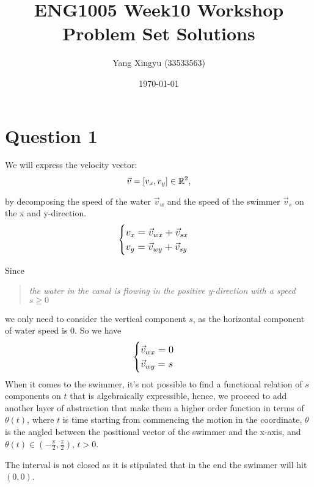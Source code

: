 \documentclass[12pt,a4paper]{article}
\begin{document}
\newcommand{\df}[2]{
    \frac{d#1}{d#2}
}

\title{ENG1005 Week10 Workshop Problem Set Solutions}
\author{Yang Xingyu (33533563)}
\date{\today}
\maketitle

\section*{Question 1}
\begin{solution}
We will express the velocity vector:
\begin{equation}\label{10:1}
    \Vec{v}=[{v}_x,{v}_y]\in \mathbb{R}^2,
\end{equation}

by decomposing the speed of the water $\Vec{v}_w$ and the speed of the swimmer $\Vec{v}_s$ on the x and y-direction.
\begin{equation}\label{10:2}
    \large
    \begin{cases}
        {v_x} = \Vec{v}_{wx} + \Vec{v}_{sx}\\
        {v_y} = \Vec{v}_{wy} + \Vec{v}_{sy}
    \end{cases}
\end{equation}

Since
\begin{quote}
    \textit{the water in the canal is flowing in the positive y-direction with a speed $s \geq 0$}
\end{quote}
we only need to consider the vertical component $s$, as the horizontal component of water speed is 0. So we have
\begin{equation}\label{10:3}
    \large
    \begin{cases}
        \Vec{v}_{wx} = 0\\
        \Vec{v}_{wy} = s
    \end{cases}
\end{equation}
When it comes to the swimmer, it's not possible to find a functional relation of $s$ components on $t$ that is algebraically expressible, hence, we proceed to add another layer of abstraction that make them a higher order function in terms of $\theta(t)$, where $t$ is time starting from commencing the motion in the coordinate, $\theta$ is the angled between the positional vector of the swimmer and the x-axis, and $\theta(t)\in(-\frac{\pi}{2}, \frac{\pi}{2}), \, t>0$.
\begin{note}
    The interval is not closed as it is stipulated that in the end the swimmer will hit $(0,0)$.
\end{note}


\end{solution}
\end{document}
